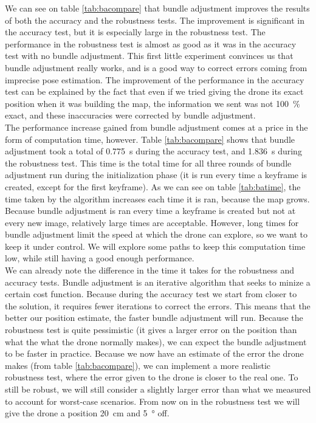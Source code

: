 We can see on table \ref{tab:bacompare} that bundle adjustment improves the results of both the accuracy and the robustness tests. The improvement is significant in the accuracy test, but it is especially large in the robustness test. The performance in the robustness test is almost as good as it was in  the accuracy test with no bundle adjustment. This first little experiment convinces us that bundle adjustment really works, and is a good way to correct errors coming from imprecise pose estimation. The improvement of the performance in the accuracy test can be explained by the fact that even if we tried giving the drone its exact position when it was building the map, the information we sent was not \SI{100}{\percent} exact, and these inaccuracies were corrected by bundle adjustment.\\

The performance increase gained from bundle adjustment comes at a price in the form of computation time, however. Table \ref{tab:bacompare} shows that bundle adjustment took a total of \SI{0.775}{\second} during the accuracy test, and \SI{1.836}{\second} during the robustness test. This time is the total time for all three rounds of bundle adjustment run during the initialization phase (it is run every time a keyframe is created, except for the first keyframe). As we can see on table \ref{tab:batime}, the time taken by the algorithm increases each time it is ran, because the map grows. Because bundle adjustment is ran every time a keyframe is created but not at every new image, relatively large times are acceptable. However, long times for bundle adjustment limit the speed at which the drone can explore, so we want to keep it under control. We will explore some paths to keep this computation time low, while still having a good enough performance. \\
We can already note the difference in the time it takes for the robustness and accuracy tests. Bundle adjustment is an iterative algorithm that seeks to minize a certain cost function. Because during the accuracy test we start from closer to the solution, it requires fewer iterations to correct the errors. This means that the better our position estimate, the faster bundle adjustment will run. Because the robustness test is quite pessimistic (it gives a larger error on the position than what the what the drone normally makes), we can expect the bundle adjustment to be faster in practice. Because we now have an estimate of the error the drone makes (from table \ref{tab:bacompare}), we can implement a more realistic robustness test, where the error given to the drone is closer to the real one. To still be robust, we will still consider a slightly larger error than what we measured to account for worst-case scenarios. From now on in the robustness test we will give the drone a position \SI{20}{\centi\meter} and \SI{5}{\degree} off. \\

